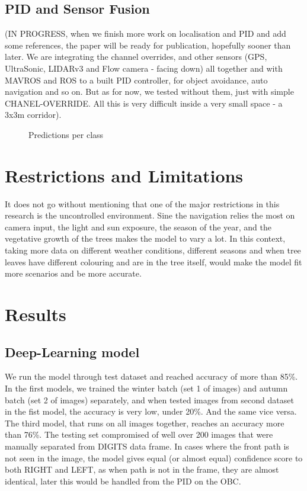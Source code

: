 \documentclass[conference]{IEEEtran}
\begin{document}
\subsection {PID and Sensor Fusion}
(IN PROGRESS, when we finish more work on localisation and PID and add some references, the paper will be ready for publication, hopefully sooner than later. We are integrating the channel overrides, and other sensors (GPS, UltraSonic, LIDARv3 and Flow camera - facing down) all together and with MAVROS and ROS to a built PID controller, for object avoidance, auto navigation and so on. But as for now, we tested without them, just with simple CHANEL-OVERRIDE. All this is very difficult inside a very small space - a 3x3m corridor).
\begin{figure}
\centering
{}\par\medskip
{}\par\medskip
{}
\caption{Predictions per class}
\label{TS}
\end{figure}


\section{Restrictions and Limitations}
It does not go without mentioning that one of the major restrictions in this research is the uncontrolled environment. Sine the navigation relies the most on camera input, the light and sun exposure, the season of the year, and the vegetative growth of the trees makes the model to vary a lot. In this context, taking more data on different weather conditions, different seasons and when tree leaves have different colouring and are in the tree itself, would make the model fit more scenarios and be more accurate.


\section{Results}
\subsection{Deep-Learning model}
We run the model through test dataset and reached accuracy of more than 85\%. In the first models, we trained the winter batch (set 1 of images) and autumn batch (set 2 of images) separately, and when tested images from second dataset in the fist model, the accuracy is very low, under 20\%. And the same vice versa. The third model, that runs on all images together, reaches an accuracy more than 76\%. The testing set compromised of well over 200 images that were manually separated from DIGITS data frame. In cases where the front path is not seen in the image, the model gives equal (or almost equal) confidence score to both RIGHT and LEFT, as when path is not in the frame, they are almost identical, later this would be handled from the PID on the OBC.
\end{document}
